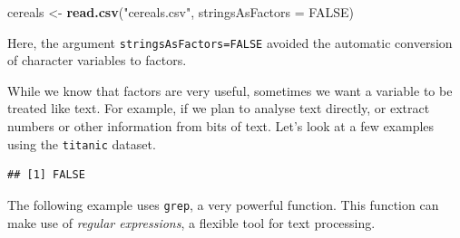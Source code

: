 \documentclass[]{book}
\newenvironment{Shaded}{\begin{snugshade}}{\end{snugshade}}
\newcommand{\CommentTok}[1]{\textcolor[rgb]{0.56,0.35,0.01}{\textit{#1}}}
\newcommand{\DataTypeTok}[1]{\textcolor[rgb]{0.13,0.29,0.53}{#1}}
\newcommand{\KeywordTok}[1]{\textcolor[rgb]{0.13,0.29,0.53}{\textbf{#1}}}
\newcommand{\NormalTok}[1]{#1}
\newcommand{\OperatorTok}[1]{\textcolor[rgb]{0.81,0.36,0.00}{\textbf{#1}}}
\newcommand{\OtherTok}[1]{\textcolor[rgb]{0.56,0.35,0.01}{#1}}
\newcommand{\StringTok}[1]{\textcolor[rgb]{0.31,0.60,0.02}{#1}}
\begin{document}
\begin{Shaded}
\begin{Highlighting}[]
\NormalTok{cereals <-}\StringTok{ }\KeywordTok{read.csv}\NormalTok{(}\StringTok{"cereals.csv"}\NormalTok{, }\DataTypeTok{stringsAsFactors =} \OtherTok{FALSE}\NormalTok{)}
\end{Highlighting}
\end{Shaded}

Here, the argument \texttt{stringsAsFactors=FALSE} avoided the automatic conversion of character variables to factors.

While we know that factors are very useful, sometimes we want a variable to be treated like text. For example, if we plan to analyse text directly, or extract numbers or other information from bits of text. Let's look at a few examples using the \texttt{titanic} dataset.

\begin{Shaded}
\end{Shaded}

\begin{verbatim}
## [1] FALSE
\end{verbatim}

\begin{Shaded}
\end{Shaded}

The following example uses \texttt{grep}, a very powerful function. This function can make use of \emph{regular expressions}, a flexible tool for text processing.

\begin{Shaded}
\end{Shaded}
\end{document}
